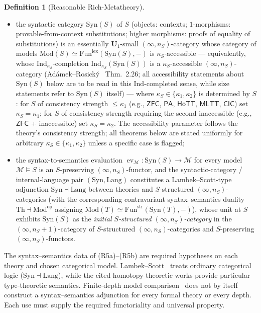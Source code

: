 \documentclass[11pt]{article}
\theoremstyle{plain}
\theoremstyle{definition}
\newtheorem{definition}[theorem]{Definition}
\newcommand{\cM}{\mathcal{M}}
\newcommand{\Fun}{\mathrm{Fun}}
\newcommand{\Syn}{\mathrm{Syn}}
\newcommand{\Mod}{\mathrm{Mod}}
\newcommand{\PA}{\mathsf{PA}}
\newcommand{\ZFC}{\mathsf{ZFC}}
\newcommand{\MLTT}{\mathsf{MLTT}}
\newcommand{\HoTT}{\mathsf{HoTT}}
\newcommand{\CIC}{\mathsf{CIC}}
\DeclareMathOperator{\ev}{ev}
\begin{document}
\begin{definition}[Reasonable Rich-Metatheory]
\begin{itemize}
\begin{itemize}
\item[\textbf{(R5a)}] the syntactic category $\Syn(S)$ of $S$ (objects: contexts; $1$-morphisms: provable-from-context substitutions; higher morphisms: proofs of equality of substitutions) is an essentially $\mathbf{U}_1$-small $(\infty, n_S)$-category whose category of models $\Mod(S) \simeq \Fun^{\mathrm{lex}}(\Syn(S), -)$ is $\kappa_S$-accessible --- equivalently, whose $\mathrm{Ind}_{\kappa_S}$-completion $\mathrm{Ind}_{\kappa_S}(\Syn(S))$ is a $\kappa_S$-accessible $(\infty, n_S)$-category (Ad\'amek--Rosick\'y~\cite{AdamekRosicky1994} Thm.~2.26; all accessibility statements about $\Syn(S)$ below are to be read in this $\mathrm{Ind}$-completed sense, while size statements refer to $\Syn(S)$ itself) --- where $\kappa_S \in \{\kappa_1, \kappa_2\}$ is determined by $S$: for $S$ of consistency strength $\leq \kappa_1$ (e.g., $\ZFC$, $\PA$, $\HoTT$, $\MLTT$, $\CIC$) set $\kappa_S = \kappa_1$; for $S$ of consistency strength requiring the second inaccessible (e.g., $\ZFC$ + inaccessible) set $\kappa_S = \kappa_2$. The accessibility parameter follows the theory's consistency strength; all theorems below are stated uniformly for arbitrary $\kappa_S \in \{\kappa_1, \kappa_2\}$ unless a specific case is flagged;
\item[\textbf{(R5b)}] the syntax-to-semantics evaluation $\ev_\cM : \Syn(S) \to \cM$ for every model $\cM \models S$ is an $S$-preserving $(\infty, n_S)$-functor, and the syntactic-category / internal-language pair $(\Syn, \mathrm{Lang})$ constitutes a Lambek--Scott-type adjunction $\Syn \dashv \mathrm{Lang}$ between theories and $S$-structured $(\infty, n_S)$-categories (with the corresponding contravariant syntax--semantics duality $\mathrm{Th} \dashv \Mod^{\mathrm{op}}$ assigning $\Mod(T) \simeq \Fun^{\mathrm{str}}(\Syn(T), -)$), whose unit at $S$ exhibits $\Syn(S)$ as the \emph{initial $S$-structured $(\infty, n_S)$-category} in the $(\infty, n_S + 1)$-category of $S$-structured $(\infty, n_S)$-categories and $S$-preserving $(\infty, n_S)$-functors.
\end{itemize}
The syntax--semantics data of (R5a)--(R5b) are required hypotheses on each theory and chosen categorical model. Lambek--Scott~\cite{LambekScott1986} treats ordinary categorical logic ($\Syn \dashv \mathrm{Lang}$), while the cited homotopy-theoretic works provide particular type-theoretic semantics. Finite-depth model comparison~\cite{BarwickSchommerPries2021,BergnerRezk2013} does not by itself construct a syntax--semantics adjunction for every formal theory or every depth. Each use must supply the required functoriality and universal property.

\end{itemize}
\end{definition}
\end{document}
